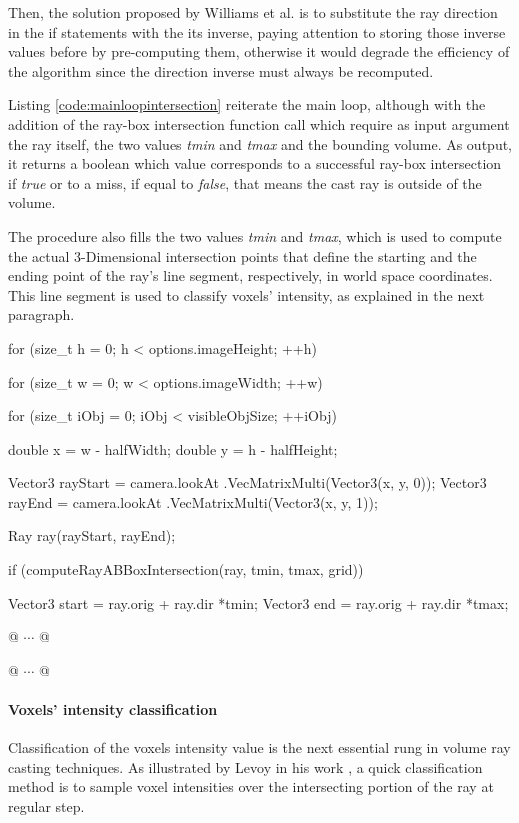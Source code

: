 \documentclass[12pt,a4paper]{extarticle}
\newcommand{\linespace}{\vspace{8pt}}
\begin{document}
Then, the solution proposed by Williams et al. \cite{Williams:2005} is to substitute the ray direction in the if statements with the its inverse, paying attention to storing those inverse values before by pre-computing them, otherwise it would degrade the efficiency of the algorithm since the direction inverse must always be recomputed. 
\linespace 

Listing \ref{code:mainloopintersection} reiterate the main loop, although with the addition of the ray-box intersection function call which require as input argument the ray itself, the two values \textit{tmin} and \textit{tmax} and the bounding volume. As output, it returns a boolean which value corresponds to a successful ray-box intersection if \emph{true} or to a miss, if equal to \emph{false}, that means the cast ray is outside of the volume.

The procedure also fills the two values \textit{tmin} and \textit{tmax}, which is used to compute the actual 3-Dimensional intersection points that define the starting and the ending point of the ray's line segment, respectively, in world space coordinates.
This line segment is used to classify voxels' intensity, as explained in the next paragraph.

\begin{cpp}[caption={Ray casting main loop enriched with ray-box intersection checking statement and ray starting and ending points},label=code:mainloopintersection]
for (size_t h = 0; h < options.imageHeight; ++h) {
	for (size_t w = 0; w < options.imageWidth; ++w) {
		for (size_t iObj = 0; iObj < visibleObjSize; ++iObj) {
			double x = w - halfWidth;
			double y = h - halfHeight;

			Vector3 rayStart = camera.lookAt
						.VecMatrixMulti(Vector3(x, y, 0));
			Vector3 rayEnd = camera.lookAt
						.VecMatrixMulti(Vector3(x, y, 1));

			Ray ray(rayStart, rayEnd);

			if (computeRayABBoxIntersection(ray, tmin, tmax, grid)) {
				Vector3 start = ray.orig + ray.dir *tmin;
				Vector3 end = ray.orig + ray.dir *tmax;
				
				@ $\cdots$ @
			}
			@ $\cdots$ @
		}
	}
}
\end{cpp}
\paragraph{Voxels' intensity classification} Classification of the voxels intensity value is the next essential rung in volume ray casting techniques. As illustrated by Levoy in his work \cite{levoy_1990:5}, a quick classification method is to sample voxel intensities over the intersecting portion of the ray at regular step.
\end{document}
